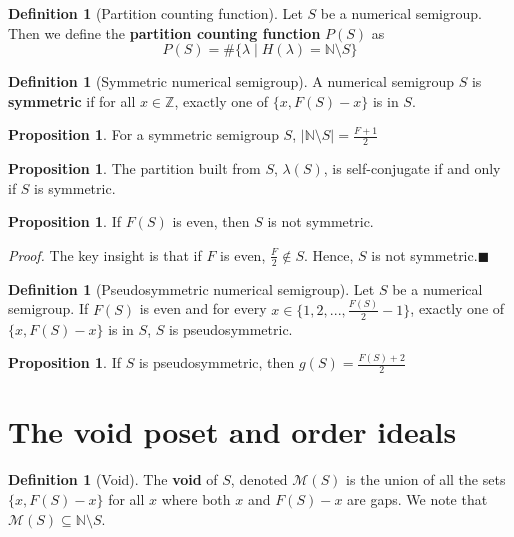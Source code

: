 \documentclass{article}
\theoremstyle{definition}
\theoremstyle{definition}
\newtheorem{defn}[thm]{Definition}
\theoremstyle{definition}
\newtheorem{prop}[thm]{Proposition}
\begin{document}
\begin{defn}[Partition counting function]
    Let $S$ be a numerical semigroup. Then we define the \textbf{partition counting function} $P(S)$ as
    $$P(S) = \#\{\lambda \mid H(\lambda) = \mathbb{N} \setminus S\}$$
\end{defn}

\begin{defn}[Symmetric numerical semigroup]
    A numerical semigroup $S$ is \textbf{symmetric} if for all $x \in \mathbb{Z}$, exactly one of $\{x, F(S)-x\}$ is in $S$.
\end{defn}

\begin{prop}
    For a symmetric semigroup $S$, $|\mathbb{N} \setminus S| = \frac{F+1}{2}$
\end{prop}

\begin{prop}
    The partition built from $S$, $\lambda(S)$, is self-conjugate if and only if $S$ is symmetric.
\end{prop}

\begin{prop}
    If $F(S)$ is even, then $S$ is not symmetric. 

    \textit{Proof. } The key insight is that if $F$ is even, $\frac{F}{2} \notin S$. Hence, $S$ is not symmetric.$\blacksquare$
\end{prop}

\begin{defn}[Pseudosymmetric numerical semigroup]
    Let $S$ be a numerical semigroup. If $F(S)$ is even and for every $x \in \{1, 2, ..., \frac{F(S)}{2} - 1\}$, exactly one of $\{x, F(S)-x\}$ is in $S$, $S$ is pseudosymmetric.
\end{defn}

\begin{prop}
    If $S$ is pseudosymmetric, then $g(S) = \frac{F(S)+2}{2}$
\end{prop}

\section{The void poset and order ideals}

\begin{defn}[Void]
    The \textbf{void} of $S$, denoted $\mathcal{M}(S)$ is the union of all the sets $\{x, F(S) -x\}$ for all $x$ where both $x$ and $F(S)-x$ are gaps. We note that $\mathcal{M}(S) \subseteq \mathbb{N} \setminus S$.
\end{defn}
\end{document}
